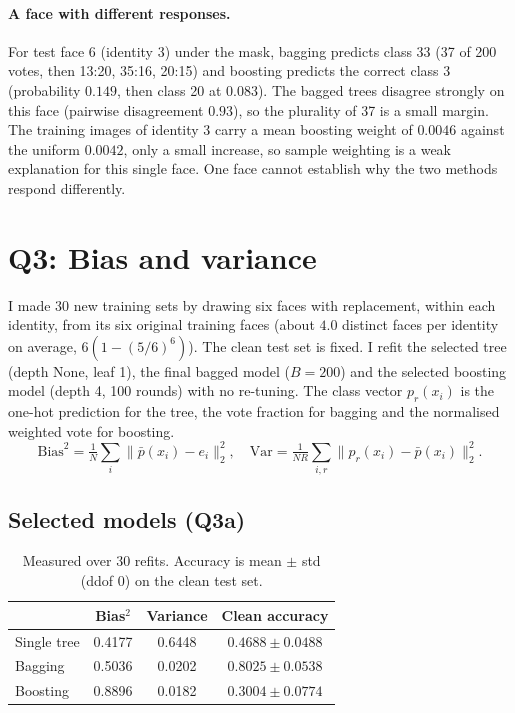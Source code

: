 \documentclass[10pt,twocolumn,letterpaper]{article}
\begin{document}
\paragraph{A face with different responses.}
For test face 6 (identity 3) under the mask, bagging predicts class 33 (37 of 200 votes, then 13:20, 35:16, 20:15) and boosting predicts the correct class 3
(probability $0.149$, then class 20 at $0.083$). The bagged trees disagree strongly on this face (pairwise disagreement $0.93$), so the plurality of 37 is a small margin.
The training images of identity 3 carry a mean boosting weight of $0.0046$ against the uniform $0.0042$, only a small increase, so sample weighting is a weak explanation
for this single face. One face cannot establish why the two methods respond differently.

\section{Q3: Bias and variance}
I made 30 new training sets by drawing six faces with replacement, within each identity, from its six original training faces
(about $4.0$ distinct faces per identity on average, $6(1-(5/6)^6)$). The clean test set is fixed. I refit the selected tree (depth None, leaf 1),
the final bagged model ($B=200$) and the selected boosting model (depth 4, 100 rounds) with no re-tuning.
The class vector $p_r(x_i)$ is the one-hot prediction for the tree, the vote fraction for bagging and the normalised weighted vote for boosting.
\begin{equation}
\text{Bias}^2=\tfrac1N\sum_i\|\bar p(x_i)-e_i\|_2^2,\quad
\text{Var}=\tfrac1{NR}\sum_{i,r}\|p_r(x_i)-\bar p(x_i)\|_2^2 .
\end{equation}

\subsection{Selected models (Q3a)}
\begin{table}[htbp]
\centering
\caption{Measured over 30 refits. Accuracy is mean $\pm$ std (ddof 0) on the clean test set.}
\label{tab:q3a}
\small
\setlength{\tabcolsep}{6pt}
\begin{tabular}{lccc}
\toprule
 & Bias$^2$ & Variance & Clean accuracy\\
\midrule
Single tree & 0.4177 & 0.6448 & $0.4688\pm0.0488$ \\
Bagging     & 0.5036 & 0.0202 & $0.8025\pm0.0538$ \\
Boosting    & 0.8896 & 0.0182 & $0.3004\pm0.0774$ \\
\bottomrule
\end{tabular}
\end{table}
\end{document}
